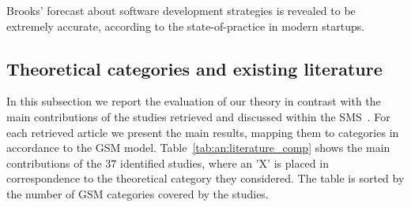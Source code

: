 \documentclass[10pt,journal,letterpaper,compsoc]{IEEEtran}
\begin{document}
Brooks' forecast about software development strategies is revealed to be
extremely accurate, according to the state-of-practice in modern startups.
\subsection{Theoretical categories and existing literature}
\label{sect:theory:validation:sms}

In this subsection we report the evaluation of our theory in contrast with the
main contributions of the studies retrieved and discussed within the 
SMS~\cite{SMS}. For each retrieved article we present the main results, mapping 
them to categories in accordance to the GSM model. 
Table~\ref{tab:an:literature_comp} shows the main contributions of the 37 
identified studies, where an 'X' is placed in correspondence to the theoretical 
category they considered. The table is sorted by the number of GSM categories 
covered by the studies.
\end{document}
